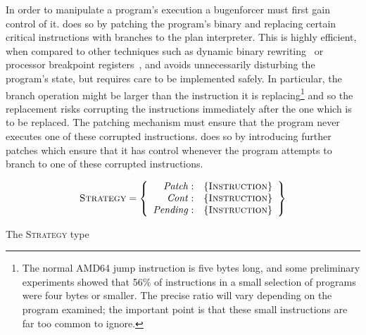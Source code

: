 In order to manipulate a program's execution a \gls{bugenforcer} must
first gain control of it.  {\Implementation} does so by patching the
program's binary and replacing certain critical instructions with
branches to the \gls{plan interpreter}.  This is highly efficient,
when compared to other techniques such as dynamic binary
rewriting~\cite{Luk2005,Nethercote2007} or processor breakpoint
registers~\cite[Chapter 16.2: Debug Registers]{Intel2009}, and avoids
unnecessarily disturbing the program's state, but requires care to be
implemented safely.  In particular, the branch operation might be
larger than the instruction it is replacing\footnote{The normal AMD64
  jump instruction is five bytes long, and some preliminary
  experiments showed that 56\% of instructions in a small selection of
  programs were four bytes or smaller.  The precise ratio will vary
  depending on the program examined; the important point is that these
  small instructions are far too common to ignore.} and so the
replacement risks corrupting the instructions immediately after the
one which is to be replaced.  The patching mechanism must ensure that
the program never executes one of these corrupted instructions.
{\Implementation} does so by introducing further patches which ensure
that it has control whenever the program attempts to branch to one of
these corrupted instructions.

\begin{sanefig}
  \begin{displaymath}
    \textsc{Strategy} = \left\{\begin{array}{rl}
    \mathit{Patch}: & \{\textsc{Instruction}\} \\
    \mathit{Cont}: & \{\textsc{Instruction}\} \\
    \mathit{Pending}: & \{\textsc{Instruction}\}
    \end{array}\right\}
  \end{displaymath}
  \vspace{-12pt}
  \caption{The \textsc{Strategy} type}
  \label{fig:patch_strategy_type}
\end{sanefig}

